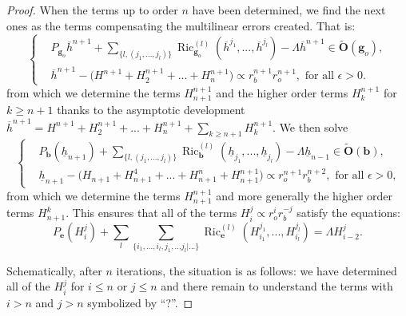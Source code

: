\documentclass[12pt]{article}
\DeclareMathOperator{\Ric}{\operatorname{Ric}}
\begin{document}
\begin{proof}
        When the terms up to order $n$ have been determined, we find the next ones as the terms compensating the multilinear errors created. That is:
        \begin{equation}
  \left\{
      \begin{aligned}
       &P_{\mathbf{g}_o}\overline{h}^{n+1}+\sum_{\{l,(j_1,...,j_l)\}}\Ric_{\mathbf{g}_o}^{(l)}(\overline{h}^{j_1},...,\overline{h}^{j_l}) - \Lambda \overline{h}^{n+1} \in \tilde{\mathbf{O}}(\mathbf{g}_o), \\
        &\overline{h}^{n+1} - \big(H^{n+1}+H^{n+1}_2+...+H^{n+1}_n\big)\propto r_b^{n+1}r_o^{n+1}, \text{ for all $\epsilon>0$.}\label{equation orbifold}
      \end{aligned}
    \right.
\end{equation}
    from which we determine the terms $H^{n+1}_{n+1}$ and the higher order terms $H^{n+1}_{k}$ for $k\geqslant n+1$ thanks to the asymptotic development $ \overline{h}^{n+1}=H^{n+1}+H^{n+1}_2+...+H^{n+1}_n+\sum_{k\geqslant n+1}H^{n+1}_{k}$. We then solve
    \begin{equation}
  \left\{
      \begin{aligned}
        &P_\mathbf{b}(\underline{h}_{n+1}) +\sum_{\{l,(j_1,...,j_l)\}}\Ric_{\mathbf{b}}^{(l)}(\underline{h}_{j_1},...,\underline{h}_{j_l}) -\Lambda \underline{h}_{n-1}\in \tilde{\mathbf{O}}(\mathbf{b}), \\
        &\underline{h}_{n+1} - \big(H_{n+1}+ H_{n+1}^4 +...+ H_{n+1}^{n} + H_{n+1}^{n+1} \big)\propto r_o^{n+1}r_b^{n+2}, \text{ for all $\epsilon>0$,}\label{equation bulle}
      \end{aligned}
    \right.
\end{equation}
    from which we determine the terms $H^{n+1}_{n+1}$ and more generally the higher order terms $ H^k_{n+1} $. This ensures that all of the terms $H_i^j\propto r_o^ir_b^{-j}$ satisfy the equations:
    $$ P_\mathbf{e}(H^j_i) + \sum_{l} \sum_{\{i_1,...,i_l,j_1,...j_l|...\}}\Ric^{(l)}_\mathbf{e}(H_{i_1}^{j_1},...,H_{i_l}^{j_l}) = \Lambda H^j_{i-2}.$$

    Schematically, after $n$ iterations, the situation is as follows: we have determined all of the $H_i^j$ for $i\leqslant n$ or $j\leqslant n$ and there remain to understand the terms with $i> n$ and $j> n$ symbolized by ``?''.
    

\end{proof}
\end{document}
